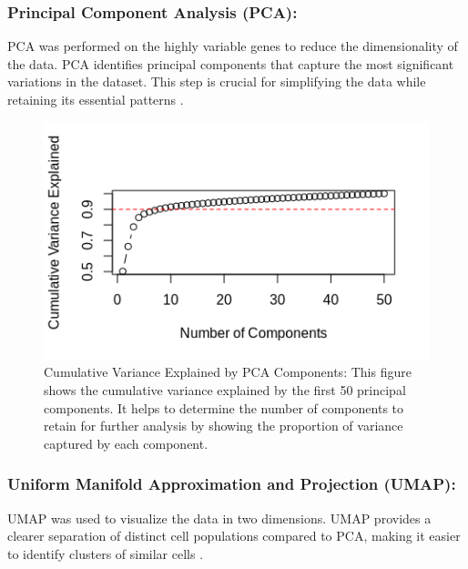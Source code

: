 \documentclass[runningheads]{llncs}
\begin{document}
\subsubsection{Principal Component Analysis (PCA):} PCA was performed on the highly variable genes to reduce the dimensionality of the data. PCA identifies principal components that capture the most significant variations in the dataset. This step is crucial for simplifying the data while retaining its essential patterns \cite{nayak2021hitchhiker}.

\begin{figure}[htbp]
\centering
\includegraphics[height=0.2\textheight, width=\textwidth]{000012.png}
\caption{Cumulative Variance Explained by PCA Components: This figure shows the cumulative variance explained by the first 50 principal components. It helps to determine the number of components to retain for further analysis by showing the proportion of variance captured by each component.}
\label{fig_variance}
\end{figure}

\subsubsection{Uniform Manifold Approximation and Projection (UMAP):} UMAP was used to visualize the data in two dimensions. UMAP provides a clearer separation of distinct cell populations compared to PCA, making it easier to identify clusters of similar cells \cite{qiu2017reversed}.
\end{document}
